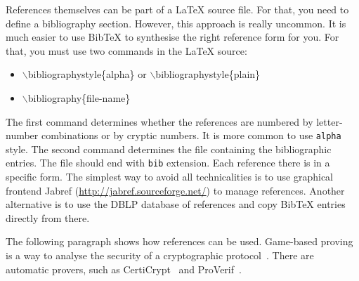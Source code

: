 References themselves can be part of a LaTeX source file. For that, you need to define a bibliography section. However, this approach is really uncommon. It is much easier to use BibTeX to synthesise the right reference form for you. For that, you must use two commands in the LaTeX source:
\begin{itemize}
\item $\backslash$bibliographystyle\{alpha\} or $\backslash$bibliographystyle\{plain\}
\item $\backslash$bibliography\{file-name\}
\end{itemize}
The first command determines whether the references are numbered by letter-number combinations or by cryptic numbers. It is more common to use \texttt{alpha} style. The second command determines the file containing the bibliographic entries. The file should end with \texttt{bib} extension. Each reference there is in a specific form. The simplest way to avoid all technicalities is to use graphical frontend  Jabref (\url{http://jabref.sourceforge.net/}) to manage references. Another alternative is to use the DBLP database of references and copy BibTeX entries directly from there.


The following paragraph shows how references can be used. Game-based proving is a way to analyse the security of a cryptographic protocol~\cite{GameB_1, GameB_2}. There are automatic provers, such as {CertiCrypt\-}~\cite{certiCrypt} and ProVerif~\cite{proVerif}.
